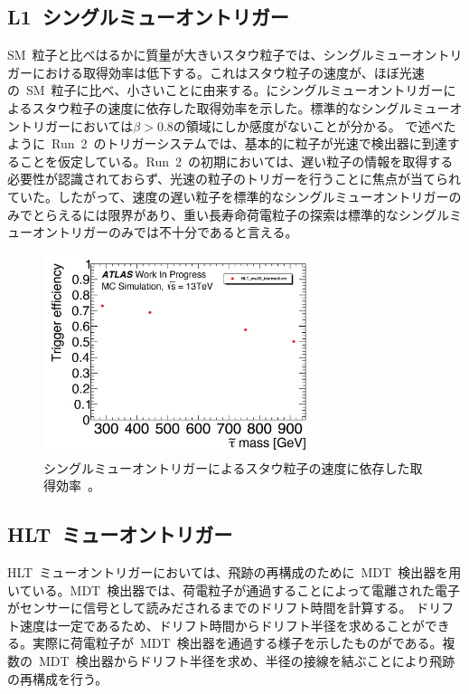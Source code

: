 \subsection{L1~シングルミューオントリガー}
SM~粒子と比べはるかに質量が大きいスタウ粒子では、シングルミューオントリガーにおける取得効率は低下する。これはスタウ粒子の速度が、ほぼ光速の~SM~粒子に比べ、小さいことに由来する。にシングルミューオントリガーによるスタウ粒子の速度に依存した取得効率を示した。標準的なシングルミューオントリガーにおいては$\beta>0.8$の領域にしか感度がないことが分かる。
で述べたように~Run~2~のトリガーシステムでは、基本的に粒子が光速で検出器に到達することを仮定している。Run~2~の初期においては、遅い粒子の情報を取得する必要性が認識されておらず、光速の粒子のトリガーを行うことに焦点が当てられていた。したがって、速度の遅い粒子を標準的なシングルミューオントリガーのみでとらえるには限界があり、重い長寿命荷電粒子の探索は標準的なシングルミューオントリガーのみでは不十分であると言える。
\begin{figure}[tbp]
        \centering   
        \includegraphics[width=0.7\textwidth,page=2]{img/pdf3/sumi.pdf}
        \caption[シングルミューオントリガーによるスタウ粒子の速度に依存した取得効率]{シングルミューオントリガーによるスタウ粒子の速度に依存した取得効率~\cite{MT:01}。}
        \label{fig:sumi2}
\end{figure}

\subsection{HLT~ミューオントリガー}
HLT~ミューオントリガーにおいては、飛跡の再構成のために~MDT~検出器を用いている。MDT~検出器では、荷電粒子が通過することによって電離された電子がセンサーに信号として読みだされるまでのドリフト時間を計算する。
ドリフト速度は一定であるため、ドリフト時間からドリフト半径を求めることができる。実際に荷電粒子が~MDT~検出器を通過する様子を示したものがである。複数の~MDT~検出器からドリフト半径を求め、半径の接線を結ぶことにより飛跡の再構成を行う。

